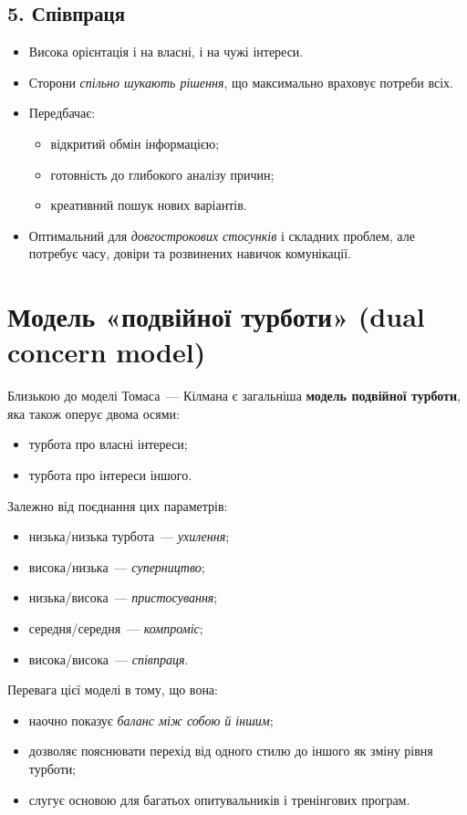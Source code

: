 \documentclass[12pt,a4paper]{article}
\begin{document}
    \subsection*{5. Співпраця}
    \begin{itemize}
        \item Висока орієнтація і на власні, і на чужі інтереси.
        \item Сторони \textit{спільно шукають рішення}, що максимально враховує потреби всіх.
        \item Передбачає:
        \begin{itemize}
            \item відкритий обмін інформацією;
            \item готовність до глибокого аналізу причин;
            \item креативний пошук нових варіантів.
        \end{itemize}
        \item Оптимальний для \textit{довгострокових стосунків} і складних проблем, але потребує часу, довіри та розвинених навичок комунікації.
    \end{itemize}

    \section*{Модель «подвійної турботи» (dual concern model)}
    Близькою до моделі Томаса~--- Кілмана є загальніша \textbf{модель подвійної турботи}, 
    яка також оперує двома осями:
    \begin{itemize}
        \item турбота про власні інтереси;
        \item турбота про інтереси іншого.
    \end{itemize}

    Залежно від поєднання цих параметрів:
    \begin{itemize}
        \item низька/низька турбота~--- \textit{ухилення};
        \item висока/низька~--- \textit{суперництво};
        \item низька/висока~--- \textit{пристосування};
        \item середня/середня~--- \textit{компроміс};
        \item висока/висока~--- \textit{співпраця}.
    \end{itemize}

    Перевага цієї моделі в тому, що вона:
    \begin{itemize}
        \item наочно показує \textit{баланс між собою й іншим};
        \item дозволяє пояснювати перехід від одного стилю до іншого як зміну рівня турботи;
        \item слугує основою для багатьох опитувальників і тренінгових програм.
    \end{itemize}
\end{document}
